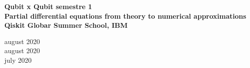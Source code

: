 \documentclass[a3paper]{adcv_color}
\begin{document}
\begin{multicols}{2}
\begin{minipage}{0.7\linewidth}
  \textbf{Qubit x Qubit semestre 1}\\
  \textbf{Partial differential equations from theory to numerical approximations}\\
  \textbf{Qiskit Globar Summer School, IBM}
\end{minipage}
\begin{minipage}{0.3\linewidth}
  \begin{flushright}
  august 2020\\
  august 2020\vspace{1cm}\\

  july 2020
\end{flushright}
\end{minipage}
  
  
  
  
  
  


\end{multicols}
\end{document}
